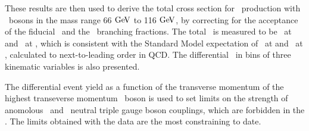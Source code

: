 These results are then used to derive the total cross section for \ZZ\
production with \Z\ bosons in the mass range 66$\GeV$ to 116$\GeV$, by
correcting for the acceptance of the fiducial \phasespace\ and the \Zll\
branching fractions. The total \cx\ is measured to be
\ZZSevenTeVTotalCrossSection\ at  and \ZZEightTeVTotalCrossSection\
at , which is consistent with the Standard Model expectation of
\ZZSevenTeVTheoryTotalCrossSection\ at \sqrtseq{7} and
\ZZEightTeVTheoryTotalCrossSection\ at \sqrtseq{8}, calculated to
next-to-leading order in QCD.  The differential \cx\ in bins of three kinematic
variables is also presented.

The differential event yield as a function of the transverse momentum of the
highest transeverse momentum \Z\ boson is used to set limits on the strength of
anomolous \ZZZ\ and \ZZg\ neutral triple gauge boson couplings, which are
forbidden in the \sm. 
The limits obtained with the \sqrtseq{8} data are the most constraining to date.
